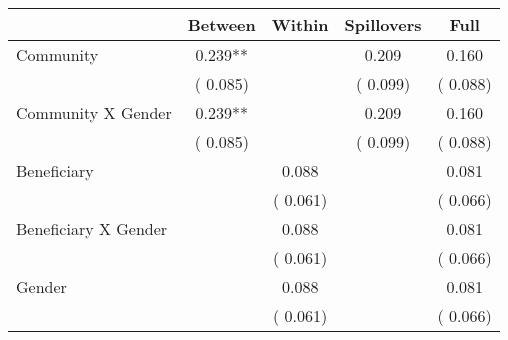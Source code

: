 
\begin{tabular}{l*{4}{c}}\hline&\multicolumn{1}{c}{Between}&\multicolumn{1}{c}{Within}&\multicolumn{1}{c}{Spillovers}&\multicolumn{1}{c}{Full}\\ \hline
 Community                                     &              0.239**      &                                               &        0.209 &         0.160                            \\ 
                                                       &        (       0.085)           &                                       &       (       0.099)     &      (       0.088)                                           \\ 
 Community X Gender            &              0.239**      &                                               &        0.209 &         0.160                            \\ 
                                                       &        (       0.085)           &                                       &       (       0.099)     &      (       0.088)                                           \\ 
 Beneficiary                           &                                               &        0.088    &                                &             0.081                            \\ 
                                                       &                                               & (       0.061)                  &                                        &      (       0.066)                                           \\ 
 Beneficiary X Gender          &                                               &        0.088    &                                &             0.081                            \\ 
                                                       &                                               & (       0.061)                  &                                        &      (       0.066)                                           \\ 
 Gender                                        &                              &        0.088    &                                &             0.081                            \\ 
                                                       &                                               & (       0.061)                  &                                        &      (       0.066)                                           \\ 

\end{tabular}
